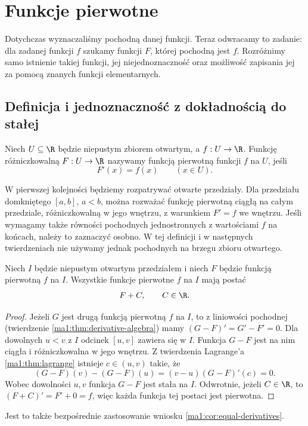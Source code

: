 \chapter{Funkcje pierwotne}
\label{ma1:ch:primitives}

Dotychczas wyznaczaliśmy pochodną danej funkcji. Teraz odwracamy to zadanie: dla zadanej funkcji $f$ szukamy funkcji $F$, której pochodną jest $f$. Rozróżnimy samo istnienie takiej funkcji, jej niejednoznaczność oraz możliwość zapisania jej za pomocą znanych funkcji elementarnych.

\section{Definicja i jednoznaczność z dokładnością do stałej}
\begin{definicja}
\label{ma1:def:primitive}
Niech $U\subseteq\R$ będzie niepustym zbiorem otwartym, a $f:U\to\R$. Funkcję różniczkowalną $F:U\to\R$ nazywamy funkcją pierwotną funkcji $f$ na $U$, jeśli
\[
 F'(x)=f(x)\qquad(x\in U).
\]
\end{definicja}
W pierwszej kolejności będziemy rozpatrywać otwarte przedziały. Dla przedziału domkniętego $[a,b]$, $a<b$, można rozważać funkcję pierwotną ciągłą na całym przedziale, różniczkowalną w jego wnętrzu, z warunkiem $F'=f$ we wnętrzu. Jeśli wymagamy także równości pochodnych jednostronnych z wartościami $f$ na końcach, należy to zaznaczyć osobno. W tej definicji i w następnych twierdzeniach nie używamy jednak pochodnych na brzegu zbioru otwartego.

\begin{twierdzenie}
\label{ma1:thm:primitive-uniqueness}
Niech $I$ będzie niepustym otwartym przedziałem i niech $F$ będzie funkcją pierwotną $f$ na $I$. Wszystkie funkcje pierwotne $f$ na $I$ mają postać
\[
 F+C,\qquad C\in\R.
\]
\end{twierdzenie}
\begin{proof}
Jeżeli $G$ jest drugą funkcją pierwotną $f$ na $I$, to z liniowości pochodnej (twierdzenie \ref{ma1:thm:derivative-algebra}) mamy $(G-F)'=G'-F'=0$. Dla dowolnych $u<v$ z $I$ odcinek $[u,v]$ zawiera się w $I$. Funkcja $G-F$ jest na nim ciągła i różniczkowalna w jego wnętrzu. Z twierdzenia Lagrange'a \ref{ma1:thm:lagrange} istnieje $c\in(u,v)$ takie, że
\[
 (G-F)(v)-(G-F)(u)=(v-u)(G-F)'(c)=0.
\]
Wobec dowolności $u,v$ funkcja $G-F$ jest stała na $I$. Odwrotnie, jeżeli $C\in\R$, to $(F+C)'=F'+0=f$, więc każda funkcja tej postaci jest pierwotna.
\end{proof}
Jest to także bezpośrednie zastosowanie wniosku \ref{ma1:cor:equal-derivatives}.

